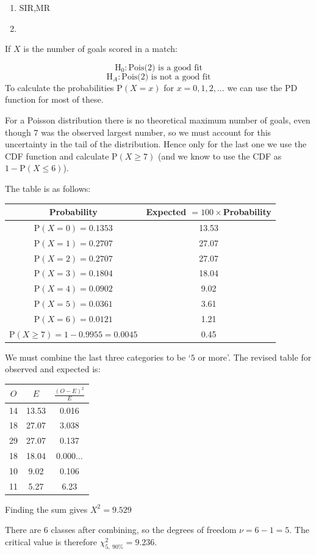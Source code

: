 \documentclass[
]{book}
\theoremstyle{definition}
\theoremstyle{definition}
\theoremstyle{definition}
\theoremstyle{definition}
\theoremstyle{remark}
\begin{document}
\begin{enumerate}
\def\labelenumi{\alph{enumi})}
\item
  SIR,MR
\item
\end{enumerate}

If \(X\) is the number of goals scored in a match:

\[\text{H}_0: \text{Pois(2)} \text{ is a good fit}\]
\[\text{H}_A: \text{Pois(2)} \text{ is not a good fit}\]
To calculate the probabilities \(\text{P}(X=x)\) for \(x=0,1,2,\ldots\) we can use the PD function for most of these.

For a Poisson distribution there is no theoretical maximum number of goals, even though \(7\) was the observed largest number, so we must account for this uncertainty in the tail of the distribution. Hence only for the last one we use the CDF function and calculate \(\text{P}(X\geq 7)\) (and we know to use the CDF as \(1-\text{P}(X\leq 6)\)).

The table is as follows:

\begin{longtable}[]{@{}cc@{}}
\toprule
Probability & Expected \(= 100 \times\)Probability\tabularnewline
\midrule
\endhead
\(\text{P}(X=0) = 0.1353\) & 13.53\tabularnewline
\(\text{P}(X=1) = 0.2707\) & 27.07\tabularnewline
\(\text{P}(X=2) = 0.2707\) & 27.07\tabularnewline
\(\text{P}(X=3) = 0.1804\) & 18.04\tabularnewline
\(\text{P}(X=4) = 0.0902\) & 9.02\tabularnewline
\(\text{P}(X=5) = 0.0361\) & 3.61\tabularnewline
\(\text{P}(X=6) = 0.0121\) & 1.21\tabularnewline
\(\text{P}(X\geq7) = 1- 0.9955 = 0.0045\) & 0.45\tabularnewline
\bottomrule
\end{longtable}

We must combine the last three categories to be `\(5\) or more'. The revised table for observed and expected is:

\begin{longtable}[]{@{}ccc@{}}
\toprule
\(O\) & \(E\) & \(\frac{(O-E)^2}{E}\)\tabularnewline
\midrule
\endhead
14 & 13.53 & 0.016\tabularnewline
18 & 27.07 & 3.038\tabularnewline
29 & 27.07 & 0.137\tabularnewline
18 & 18.04 & 0.000\(\ldots\)\tabularnewline
10 & 9.02 & 0.106\tabularnewline
11 & 5.27 & 6.23\tabularnewline
\bottomrule
\end{longtable}

Finding the sum gives \(X^2 = 9.529\)

There are \(6\) classes after combining, so the degrees of freedom \(\nu = 6-1 =5\). The critical value is therefore \(\chi^2_{5, \ 90\%} = 9.236\).
\end{document}
